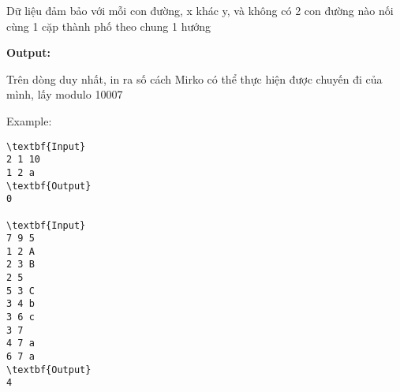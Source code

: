 Dữ liệu đảm bảo với mỗi con đường, x khác y, và không có 2 con đường nào nối cùng 1 cặp thành phố theo chung 1 hướng





\textbf{Output:}


Trên dòng duy nhất, in ra số cách Mirko có thể thực hiện được chuyến đi của mình, lấy modulo 10007





Example:
\begin{verbatim}
\textbf{Input}
2 1 10
1 2 a
\textbf{Output}
0

\textbf{Input}
7 9 5
1 2 A
2 3 B
2 5
5 3 C
3 4 b
3 6 c
3 7
4 7 a
6 7 a
\textbf{Output}
4\end{verbatim}
